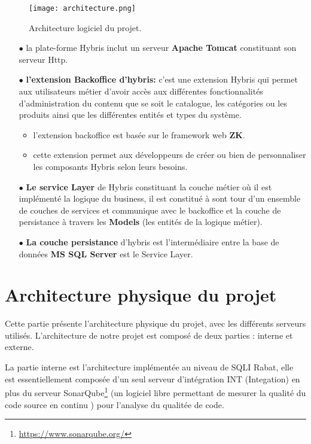 \begin{figure}[ht]
  \centering
  \texttt{[image: architecture.png]}
  \caption{Architecture logiciel du projet.}
  \label{fig:architecture}
\end{figure}
\FloatBarrier


\begin{itemize}
    \item[$\bullet$] la plate-forme Hybris inclut un serveur \textbf{Apache Tomcat} constituant son serveur Http.
    \medskip
    \item[$\bullet$] \textbf{l'extension Backoffice d'hybris:} c'est une extension Hybris qui permet aux utilisateurs métier d'avoir accès aux différentes fonctionnalités d'administration du contenu que se soit le catalogue, les catégories ou les produits ainsi que les différentes entités et types du système.
    \begin{itemize}
    \smallskip
        \item l'extension backoffice est basée sur le framework web \textbf{ZK}.
        \smallskip
        \item cette extension permet aux développeurs de créer ou bien de personnaliser les composants Hybris selon leurs besoins.
    \end{itemize}
    \medskip
    \item[$\bullet$] \textbf{Le service Layer} de Hybris constituant la couche métier où il est implémenté la logique du business, il est constitué à sont tour d'un ensemble de couches de services et communique avec le backoffice et la couche de persistance à travers les \textbf{Models} (les entités de la logique métier).
    \medskip
    \item[$\bullet$] \textbf{La couche persistance} d'hybris est l'intermédiaire entre la base de données \textbf{MS SQL Server} est le Service Layer.
    
\end{itemize}

\section{Architecture physique du projet}

Cette partie présente l’architecture physique du projet, avec les différents serveurs utilisés. L’architecture de notre projet est composé de deux parties : interne et externe.

\medskip

La partie interne est l'architecture implémentée au niveau de SQLI Rabat, elle est essentiellement composée d'un seul serveur d'intégration INT (Integation) en plus du serveur SonarQube\footnote{\url{https://www.sonarqube.org/}} (un logiciel libre permettant de mesurer la qualité du code source en continu \cite{wiki:sonarqube}) pour l'analyse du qualitée de code. 

